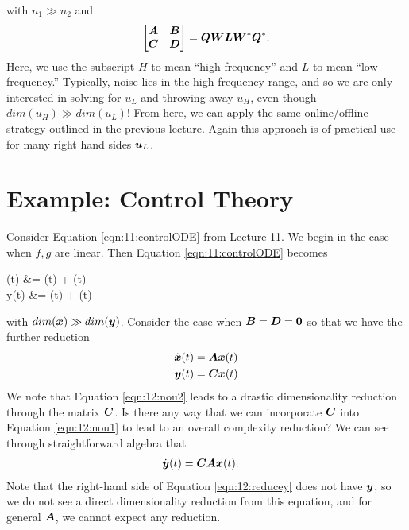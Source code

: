 with $n_1 \gg n_2$ and 
\begin{align}
    \begin{bmatrix}
    \boldsymbol{A} & \boldsymbol{B} \\
    \boldsymbol{C} & \boldsymbol{D}
    \end{bmatrix} = \boldsymbol{Q} \boldsymbol{W} \boldsymbol{L} \boldsymbol{W}^{*} \boldsymbol{Q}^{*}.
\end{align}
Here, we use the subscript $H$ to mean ``high frequency'' and $L$ to mean ``low frequency.'' Typically, noise lies in the high-frequency range, and so we are only interested in solving for $u_L$ and throwing away $u_H$, even though $dim(u_H) \gg dim(u_L)$!
From here, we can apply the same online/offline strategy outlined in the previous lecture. Again this approach is of practical use for many right hand sides $\boldsymbol{u}_L$.

\section{Example: Control Theory}
Consider Equation \ref{eqn:11:controlODE} from Lecture 11. We begin in the case when $f,g$ are linear. Then Equation \ref{eqn:11:controlODE} becomes
\begin{ceqn} \label{eqn:12:linearcontrol}
(t) &=  (t) +  (t) \\
y(t) &=  (t) +  (t)
\end{ceqn}
with $dim(\boldsymbol{x}) \gg dim(\boldsymbol{y})$. Consider the case when $\boldsymbol{B} = \boldsymbol{D} = \boldsymbol{0}$ so that we have the further reduction
\begin{align} 
\dot{\boldsymbol{x}}(t) &= \boldsymbol{A} \boldsymbol{x}(t) \label{eqn:12:nou1} \\
\boldsymbol{y}(t) &= \boldsymbol{C} \boldsymbol{x}(t) \label{eqn:12:nou2}
\end{align}
We note that Equation \ref{eqn:12:nou2} leads to a drastic dimensionality reduction through the matrix $\boldsymbol{C}$. Is there any way that we can incorporate $\boldsymbol{C}$ into Equation \ref{eqn:12:nou1} to lead to an overall complexity reduction? We can see through straightforward algebra that
\begin{align} \label{eqn:12:reducey}
\dot{\boldsymbol{y}}(t) &= \boldsymbol{C} \boldsymbol{A} \boldsymbol{x}(t).
\end{align}
Note that the right-hand side of Equation \ref{eqn:12:reducey} does not have $\boldsymbol{y}$, so we do not see a direct dimensionality reduction from this equation, and for general $\boldsymbol{A}$, we cannot expect any reduction.   